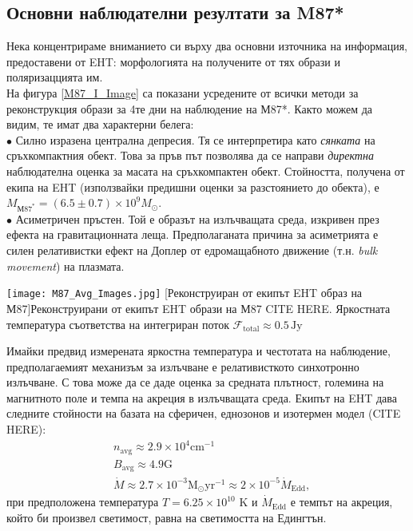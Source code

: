 \subsection{Основни наблюдателни резултати за M87*}

Нека концентрираме вниманието си върху два основни източника на информация, предоставени от EHT: морфологията на получените от тях образи и поляризаццията им. \\

На фигура \ref*{M87_I_Image} са показани усредените от всички методи за реконструкция образи за 4те дни на наблюдение на М87*. Както можем да видим, те имат два характерни белега:\\

$\bullet$ Силно изразена централна депресия. Тя се интерпретира като \emph{сянката} на сръхкомпактния обект. Това за пръв път позволява да се направи \emph{директна} наблюдателна оценка за масата на сръхкомпактен обект. Стойността, получена от екипа на EHT (използвайки предишни оценки за разстоянието до обекта), е $M_{М87^*} = (6.5\pm 0.7)\times 10^{9} M_\odot$.\\

$\bullet$ Асиметричен пръстен. Той е образът на излъчващата среда, изкривен през ефекта на гравитационната леща. Предполаганата причина за асиметрията е силен релативистки ефект на Доплер от едромащабното движение (т.н. \emph{bulk movement}) на плазмата.\\

\begin{minipage}{15em}
	\centering
	\texttt{[image: М87\_Avg\_Images.jpg]}
	[Реконструиран от екипът EHT образ на М87]{Реконструирани от екипът EHT образи на М87 CITE HERE. Яркостната температура съответства на интегриран поток $\mathcal{F}_{\text{total}}\approx0.5\,\text{Jy}$}
	\label{M87_I_Image}
\end{minipage}
\begin{minipage}{16em}
	Имайки предвид измерената яркостна температура и честотата на наблюдение, предполагаемият механизъм за излъчване е релативисткото синхотронно излъчване. С това може да се даде оценка за средната плътност, големина на магнитното поле и темпа на акреция в излъчващата среда. Екипът на EHT дава следните стойности на базата на сферичен, еднозонов и изотермен модел (CITE HERE):
	\begin{equation}
		\begin{aligned}
			&n_{\text{avg}} \approx 2.9\times 10^{4} \text{cm}^{-1}\\
			&B_{\text{avg}} \approx 4.9 \text{G}\\
			&\dot{M} \approx 2.7\times 10^{-3} \text{M}_\odot \text{yr}^{-1} \approx 2 \times 10^{-5} \dot{M}_{\text{Edd}},
		\end{aligned}
	\end{equation}
	при предположена температура $T = 6.25\times 10^{10}$ K и $\dot{M}_{\text{Edd}}$ е темпът на акреция, който би произвел светимост, равна на светимостта на Едингтън. 
\end{minipage}\\

